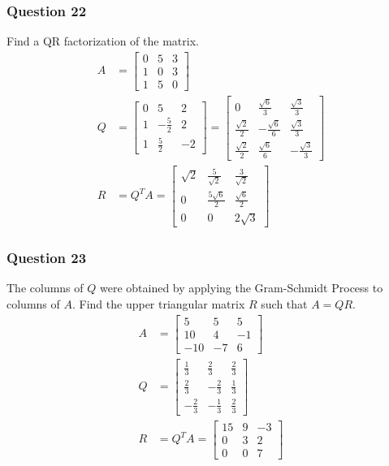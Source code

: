 \documentclass{math}
\begin{document}
\subsubsection*{Question 22}
Find a QR factorization of the matrix.
\begin{align*}
  A &= \begin{bmatrix}
    0 & 5 & 3 \\
    1 & 0 & 3 \\
    1 & 5 & 0
  \end{bmatrix} \\
  Q &= \begin{bmatrix}
    0 & 5 & 2 \\
    1 & -\frac{5}{2} & 2 \\
    1 & \frac{5}{2} & -2
  \end{bmatrix} = \begin{bmatrix}
    0 & \frac{\sqrt{6}}{3} & \frac{\sqrt{3}}{3} \\
    \frac{\sqrt{2}}{2} & -\frac{\sqrt{6}}{6} & \frac{\sqrt{3}}{3} \\
    \frac{\sqrt{2}}{2} & \frac{\sqrt{6}}{6} & -\frac{\sqrt{3}}{3}
  \end{bmatrix} \\
  R &= Q^TA = \begin{bmatrix}
    \sqrt{2} & \frac{5}{\sqrt{2}} & \frac{3}{\sqrt{2}} \\
    0 & \frac{5\sqrt{6}}{2} & \frac{\sqrt{6}}{2} \\
    0 & 0 & 2\sqrt{3}
  \end{bmatrix}
\end{align*}

\subsubsection*{Question 23}
The columns of \( Q \) were obtained by applying the Gram-Schmidt Process to
columns of \( A \). Find the upper triangular matrix \( R \) such that
\( A = QR \).
\begin{align*}
  A &= \begin{bmatrix}
    5 & 5 & 5 \\
    10 & 4 & -1 \\
    -10 & -7 & 6
  \end{bmatrix} \\
  Q &= \begin{bmatrix}
    \frac{1}{3} & \frac{2}{3} & \frac{2}{3} \\
    \frac{2}{3} & -\frac{2}{3} & \frac{1}{3} \\
    -\frac{2}{3} & -\frac{1}{3} & \frac{2}{3}
  \end{bmatrix} \\
  R &= Q^TA = \begin{bmatrix}
    15 & 9 & -3 \\
    0 & 3 & 2 \\
    0 & 0 & 7
  \end{bmatrix}
\end{align*}
\end{document}
